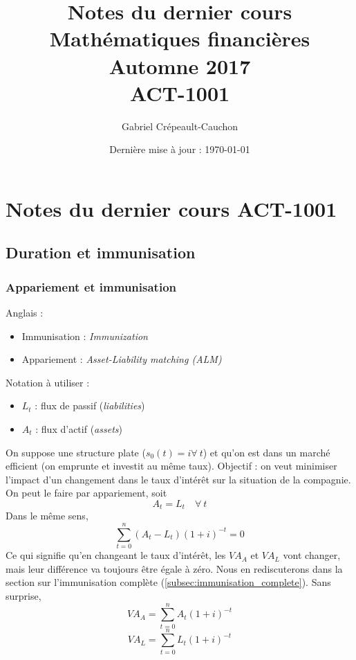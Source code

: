 \documentclass[12pt, french]{report}
\title{Notes du dernier cours \\ Mathématiques financières \\ Automne 2017 \\ ACT-1001}
\author{Gabriel Crépeault-Cauchon}
\date{Dernière mise à jour : \today}
\begin{document}
\part*{Notes du dernier cours ACT-1001}


\chapter{Duration et immunisation}
\setcounter{section}{1}		%

\section{Appariement et immunisation}
Anglais :
\begin{itemize}
	\item Immunisation : \emph{Immunization}
	\item Appariement  : \emph{Asset-Liability matching (ALM)}
\end{itemize}
\p
Notation à utiliser :
\begin{itemize}
	\item $L_t$ : flux de passif (\emph{liabilities})
	\item $A_t$ : flux d'actif (\emph{assets})
\end{itemize}

\bcsmbh On suppose une structure plate ($s_0(t) = i \forall\ t$) et qu'on est
dans un marché efficient (on emprunte et investit au même taux).
\p
Objectif : on veut minimiser l'impact d'un changement dans le taux d'intérêt sur
la situation de la compagnie. On peut le faire par appariement, soit
\begin{displaymath}
	A_t = L_t \quad \forall\ t
\end{displaymath}
Dans le même sens,
\begin{displaymath}
	\sum_{t=0}^n (A_t - L_t)(1+i)^{-t} = 0
\end{displaymath}
Ce qui signifie qu'en changeant le taux d'intérêt, les $VA_A$ et $VA_L$ vont
changer, mais leur différence va toujours être égale à zéro. Nous en rediscuterons
dans la section sur l'immunisation complète (\ref{subsec:immunisation_complete}).
\p
Sans surprise,
\begin{equation}
	VA_A = \sum_{t=0}^n A_t(1+i)^{-t}
\end{equation}
\begin{equation}
	VA_L = \sum_{t=0}^n L_t(1+i)^{-t}
\end{equation}
\end{document}
